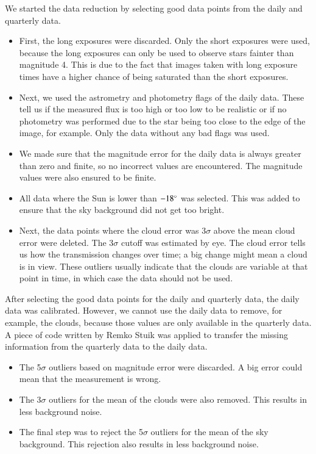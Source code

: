 \documentclass[onecolumn]{aa} %
\begin{document}
We started the data reduction by selecting good data points from the daily and quarterly data. 
\begin{itemize}
    \item First, the long exposures were discarded. Only the short exposures were used, because the long exposures can only be used to observe stars fainter than magnitude 4. This is due to the fact that images taken with long exposure times have a higher chance of being saturated than the short exposures.
    \item Next, we used the astrometry and photometry flags of the daily data. These tell us if the measured flux is too high or too low to be realistic or if no photometry was performed due to the star being too close to the edge of the image, for example. Only the data without any bad flags was used. 
    \item We made sure that the magnitude error for the daily data is always greater than zero and finite, so no incorrect values are encountered. The magnitude values were also ensured to be finite.
    \item All data where the Sun is lower than $-18^\circ$ was selected. This was added to ensure that the sky background did not get too bright. 
    \item Next, the data points where the cloud error was 3$\sigma$ above the mean cloud error were deleted. The 3$\sigma$ cutoff was estimated by eye. The cloud error tells us how the transmission changes over time; a big change might mean a cloud is in view. These outliers usually indicate that the clouds are variable at that point in time, in which case the data should not be used.
\end{itemize}
After selecting the good data points for the daily and quarterly data, the daily data was calibrated. However, we cannot use the daily data to remove, for example, the clouds, because those values are only available in the quarterly data. A piece of code written by Remko Stuik was applied to transfer the missing information from the quarterly data to the daily data. 
\begin{itemize}
    \item The 5$\sigma$ outliers based on magnitude error were discarded. A big error could mean that the measurement is wrong. 
    \item The 3$\sigma$ outliers for the mean of the clouds were also removed. This results in less background noise.
    \item The final step was to reject the 5$\sigma$ outliers for the mean of the sky background. This rejection also results in less background noise.
\end{itemize}
\end{document}

